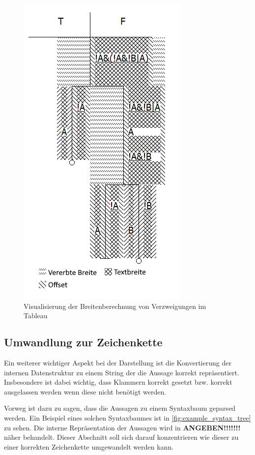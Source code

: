 \begin{figure}[h]
\begin{center}
\includegraphics[scale=1]{images/drawing_logic_calc_widths.png}
\caption{Visualisierung der Breitenberechnung von Verzweigungen im Tableau}
\label{fig:drawing_logic_calc_widths}
\end{center}
\end{figure}

\subsection{Umwandlung zur Zeichenkette}
Ein weiterer wichtiger Aspekt bei der Darstellung ist die Konvertierung der internen Datenstruktur zu einem String der die Aussage korrekt repräsentiert. Insbesondere ist dabei wichtig, dass Klammern korrekt gesetzt bzw. korrekt ausgelassen werden wenn diese nicht benötigt werden.

Vorweg ist dazu zu sagen, dass die Aussagen zu einem Syntaxbaum geparsed werden. Ein Beispiel eines solchen Syntaxbaumes ist in \autoref{fig:example_syntax_tree} zu sehen. Die interne Repräsentation der Aussagen wird in \textbf{ANGEBEN!!!!!!!} näher behandelt. Dieser Abschnitt soll sich darauf konzentrieren wie dieser zu einer korrekten Zeichenkette umgewandelt werden kann.

